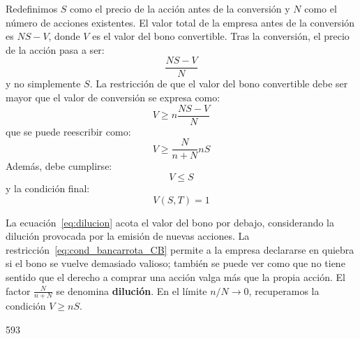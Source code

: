 Redefinimos $S$ como el precio de la acción antes de la conversión y $N$ como el número de acciones existentes. El valor total de la empresa antes de la conversión es $NS - V$, donde $V$ es el valor del bono convertible. Tras la conversión, el precio de la acción pasa a ser:
\begin{equation*}
    \frac{NS - V}{N}
\end{equation*}
y no simplemente $S$. La restricción de que el valor del bono convertible debe ser mayor que el valor de conversión se expresa como:
\begin{equation*}
    V \geq n \frac{NS - V}{N}
\end{equation*}
que se puede reescribir como:
\begin{equation}
    \boxed{V \geq \frac{N}{n + N} nS}
    \label{eq:dilucion}
\end{equation}
Además, debe cumplirse:
\begin{equation}
    V \leq S
    \label{eq:cond_bancarrota_CB}
\end{equation}
y la condición final:
\begin{equation*}
    V(S, T) = 1
\end{equation*}

La ecuación~\eqref{eq:dilucion} acota el valor del bono por debajo, considerando la dilución provocada por la emisión de nuevas acciones. La restricción~\eqref{eq:cond_bancarrota_CB} permite a la empresa declararse en quiebra si el bono se vuelve demasiado valioso; también se puede ver como que no tiene sentido que el derecho a comprar una acción valga más que la propia acción. El factor $\frac{N}{n + N}$ se denomina \textbf{dilución}. En el límite $n/N \to 0$, recuperamos la condición $V \geq nS$.



593




